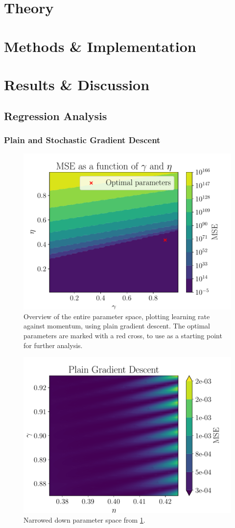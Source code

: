 \documentclass[aps,pra,english,notitlepage,reprint,nofootinbib]{revtex4-1}  %
\begin{document}
\section{Theory}\label{sec:theory}

% 

\section{Methods \& Implementation}\label{sec:methods}

% 

\section{Results \& Discussion}\label{sec:results discussion}
\subsection{Regression Analysis}
\subsubsection{Plain and Stochastic Gradient Descent}
\begin{figure}[h!]
    \centering
    \includegraphics[width = .4\textwidth]{../figs/a_2_parameter_overview.pdf}
    \caption{Overview of the entire parameter space, plotting learning rate against momentum,  using plain gradient descent. The optimal parameters are marked with a red cross, to use as a starting point for further analysis.}
    \label{fig: param_overview}
\end{figure}

\begin{figure}[h!]
    \centering
    \includegraphics[width = .4\textwidth]{../figs/GD_eta_gamma.pdf}
    \caption{Narrowed down parameter space from \cref{fig: param_overview}.}
    \label{fig: param_narrowed}
\end{figure}
\end{document}
